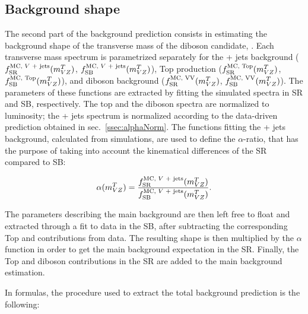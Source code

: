 



\subsection{Background shape}\label{ssec:alphaShape}

The second part of the background prediction consists in estimating the background shape of the transverse mass of the diboson candidate, \mtVZ. Each transverse mass spectrum is parametrized separately for the \V + jets background ($f_{\text{SR}}^{\text{MC, \V + jets}}(\mtVZ)$, $f_{\text{SB}}^{\text{MC, \V + jets}}(\mtVZ)$), Top production ($f_{\text{SR}}^{\text{MC, Top}}(m_{VZ}^T)$, $f_{\text{SB}}^{\text{MC, Top}}(m_{VZ}^T)$), and diboson background ($f_{\text{SR}}^{\text{MC, VV}}(m_{VZ}^T)$, $f_{\text{SB}}^{\text{MC, VV}}(m_{VZ}^T)$). The parameters of these functions are extracted by fitting the simulated \mtVZ spectra in SR and SB, respectively. The top and the diboson spectra are normalized to luminosity; the \V + jets spectrum is normalized according to the data-driven prediction obtained in sec.~\ref{ssec:alphaNorm}. The functions fitting the \V + jets background, calculated from simulations, are used to define the $\alpha$-ratio, that has the purpose of taking into account the kinematical differences of the SR compared to SB:

\begin{equation}
\alpha(\mtVZ) = \frac{f_{\text{SR}}^{\text{MC, \V + jets}}(\mtVZ)}{f_{\text{SB}}^{\text{MC, \V + jets}}(\mtVZ)}.
\end{equation}

\noindent The parameters describing the main background are then left free to float and extracted through a fit to data in the SB, after subtracting the corresponding Top and \VV contributions from data. The resulting shape is then multiplied by the $\alpha$ function in order to get the main background expectation in the SR. Finally, the Top and diboson contributions in the SR are added to the main background estimation.

\noindent In formulas, the procedure used to extract the total background prediction is the following:



